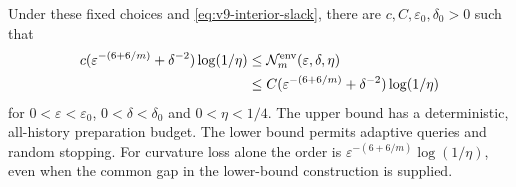 \begin{theorem}
\label{thm:v9-envelope-minimax}
Under these fixed choices and \eqref{eq:v9-interior-slack}, there
are $c,C,\varepsilon_0,\delta_0>0$ such that
\begin{equation}\label{eq:v9-envelope-rate}
 \begin{split}
 c(\varepsilon^{-(6+6/m)}+\delta^{-2})\log(1/\eta)
 &\le \mathcal N_m^{\rm env}(\varepsilon,\delta,\eta)\\
 &\le C(\varepsilon^{-(6+6/m)}+\delta^{-2})\log(1/\eta)
 \end{split}
\end{equation}
for $0<\varepsilon<\varepsilon_0$, $0<\delta<\delta_0$ and
$0<\eta<1/4$. The upper bound has a deterministic, all-history
preparation budget. The lower bound permits adaptive queries and
random stopping. For curvature loss alone the order is
$\varepsilon^{-(6+6/m)}\log(1/\eta)$, even when the common gap in
the lower-bound construction is supplied.
\end{theorem}

